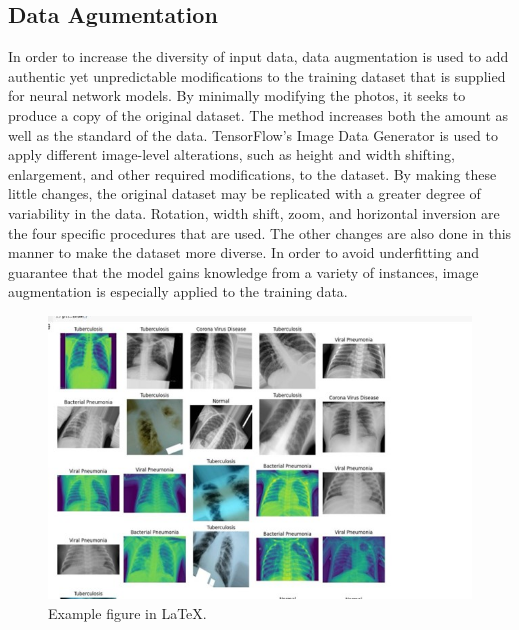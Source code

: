 \subsection{Data Agumentation}
In order to increase the diversity of input data, data augmentation is used to add authentic yet unpredictable modifications to the training dataset that is supplied for neural network models. By minimally modifying the photos, it seeks to produce a copy of the original dataset. The method increases both the amount as well as the standard of the data. TensorFlow's Image Data Generator is used to apply different image-level alterations, such as height and width shifting, enlargement, and other required modifications, to the dataset. By making these little changes, the original dataset may be replicated with a greater degree of variability in the data. Rotation, width shift, zoom, and horizontal inversion are the four specific procedures that are used. The other changes are also done in this manner to make the dataset more diverse. In order to avoid underfitting and guarantee that the model gains knowledge from a variety of instances, image augmentation is especially applied to the training data.
\begin{figure}[ht]
    \centering
    \includegraphics[scale=0.3]{figures/scan .jpg}
    \caption{Example figure in \LaTeX.}
    \label{fig:chart_a}
\end{figure}
